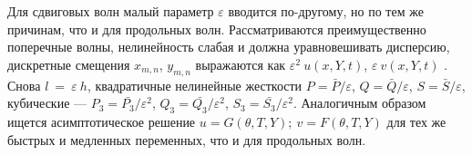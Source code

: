 Для сдвиговых волн малый параметр $ \varepsilon $ вводится по-другому, но по тем же причинам, что и для продольных волн. Рассматриваются преимущественно поперечные волны, нелинейность слабая и должна уравновешивать дисперсию, дискретные смещения $ x_{m, n} $, $ y_{m, n} $ выражаются как $ \varepsilon^2 ~ u (x, Y, t)$, $\varepsilon ~ v (x, Y, t) $ \cite{PorOsAnt2020}. Снова $l ~ = ~ \varepsilon ~ h $, квадратичные нелинейные жесткости $P=\bar{P}/\varepsilon$, $Q=\bar{Q}/\varepsilon$, $S=\bar{S}/\varepsilon$,  кубические ---  $P_3=\bar{P_3}/\varepsilon^2$, $Q_3=\bar{Q_3}/\varepsilon^2$, $S_3=\bar{S_3}/\varepsilon^2$. 
Аналогичным образом ищется асимптотическое решение $u= G\left(\theta, T ,Y\right);~ v= F\left(\theta, T, Y\right)$ для тех же быстрых и медленных переменных, что и для продольных волн. 
